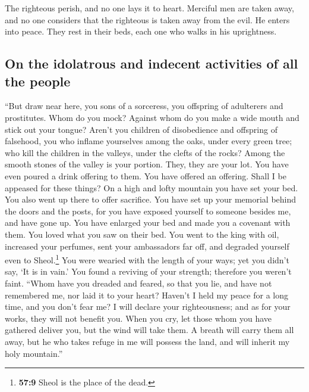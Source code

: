  The righteous perish, and no one lays it to heart.
Merciful men are taken away, and no one considers that the righteous is
taken away from the evil.  He enters into peace. They rest
in their beds, each one who walks in his uprightness.

\hypertarget{on-the-idolatrous-and-indecent-activities-of-all-the-people}{%
\subsection{On the idolatrous and indecent activities of all the
people}\label{on-the-idolatrous-and-indecent-activities-of-all-the-people}}

 ``But draw near here, you sons of a sorceress, you
offspring of adulterers and prostitutes.  Whom do you
mock? Against whom do you make a wide mouth and stick out your tongue?
Aren't you children of disobedience and offspring of falsehood,
 you who inflame yourselves among the oaks, under every
green tree; who kill the children in the valleys, under the clefts of
the rocks?  Among the smooth stones of the valley is your
portion. They, they are your lot. You have even poured a drink offering
to them. You have offered an offering. Shall I be appeased for these
things?  On a high and lofty mountain you have set your
bed. You also went up there to offer sacrifice.  You have
set up your memorial behind the doors and the posts, for you have
exposed yourself to someone besides me, and have gone up. You have
enlarged your bed and made you a covenant with them. You loved what you
saw on their bed.  You went to the king with oil,
increased your perfumes, sent your ambassadors far off, and degraded
yourself even to Sheol.\footnote{\textbf{57:9} Sheol is the place of the
  dead.}  You were wearied with the length of your ways;
yet you didn't say, `It is in vain.' You found a reviving of your
strength; therefore you weren't faint.  ``Whom have you
dreaded and feared, so that you lie, and have not remembered me, nor
laid it to your heart? Haven't I held my peace for a long time, and you
don't fear me?  I will declare your righteousness; and as
for your works, they will not benefit you.  When you cry,
let those whom you have gathered deliver you, but the wind will take
them. A breath will carry them all away, but he who takes refuge in me
will possess the land, and will inherit my holy mountain.''

